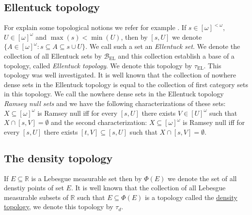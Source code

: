 \documentclass[12pt]{amsart}
\theoremstyle{plain}
\theoremstyle{definition}
\theoremstyle{remark}
\newcommand{\ca}{2^{\omega}}
\newcommand{\finsub}{[\omega]^{<\omega}}
\newcommand{\infsub}{[\omega]^{\omega}}
\newcommand{\real}{\mathbb{R}}
\newcommand{\seq}{\subseteq}
\newcommand{\cB}{{\mathcal B}}
\newcommand{\tauEllentuck}{\tau_{\mathrm{EL}}}
\newcommand{\baseEllentuck}{\cB_{\mathrm{EL}}}
\begin{document}
\subsection{Ellentuck topology}
For explain some topological notions we refer for example \cite{En}.
If $s \in \finsub$, $U \in \infsub$ and $\max (s) < \min(U)$,
then by $[s, U]$ we denote $\{ A \in \infsub: s \seq A \seq s \cup U\}$.
We call such a set an {\it Ellentuck set}. We denote the collection of all
Ellentuck sets by $\baseEllentuck$ and this collection establish a base of a topology, called 
{\it Ellentuck topology}. We denote this topology 
by $\tauEllentuck$. This topology was well investigated.
It is well known that the collection of nowhere dense sets in the Ellentuck 
topology is equal to the  collection of first category sets in this topology.
We call the nowhere dense sets in the Ellentuck topology 
{\it Ramsey null sets} and we have the following characterizations of
these sets: $X \subseteq \infsub$ is Ramsey null iff for every $[s, U]$ there exists $V \in [U]^\omega$
such that $X \cap [s, V] = \emptyset$ and the second characterization:
$X \subseteq \infsub$ is Ramsey null iff for every $[s, U]$ there exists $[t, V] \subseteq [s, U]$
such that $X \cap [s, V] = \emptyset$.
\subsection{The density topology}
If $E \subseteq \real$ is a Lebesgue measurable set then by $\Phi(E)$ we denote the set of all denstiy
points of set $E$. It is well known that the collection of all Lebesgue measurable subsets of $\real$
such that $E \subseteq \Phi(E)$ is a topology called the \underline{density topology}, we denote
this topology by $\tau_d$.
\end{document}
